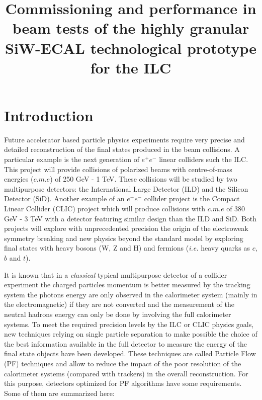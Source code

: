 \documentclass[a4paper,11pt]{article}
\title{\boldmath Commissioning and performance in beam tests of the highly granular SiW-ECAL technological prototype for the ILC}
\begin{document}
\maketitle
\flushbottom


\section{Introduction}

Future accelerator based particle physics experiments
require very precise and detailed reconstruction of the final states produced
in the beam collisions. A particular example is the next generation of $e^{+}e^{-}$
linear colliders such the ILC\cite{Behnke:2013xla,Baer:2013cma,Adolphsen:2013jya,Adolphsen:2013kya,Behnke:2013lya}.
This project will provide collisions of polarized beams with centre-of-mass energies ($c.m.e$) of 250 GeV - 1 TeV.
These collisions will be studied by two multipurpose detectors:
the International Large Detector (ILD) and the Silicon Detector (SiD)\cite{Behnke:2013lya}.
Another example of an $e^{+}e^{-}$ collider project is the Compact Linear Collider (CLIC)
project\cite{Aicheler:2012bya,Linssen:2012hp,Lebrun:2012hj}
which will produce collisions with $c.m.e$ of 380 GeV - 3 TeV
with a detector featuring similar design than the ILD and SiD.
Both projects will explore with unprecedented precision the origin of the electroweak symmetry breaking and new physics beyond the standard model by exploring final states with heavy bosons (W, Z  and H) and fermions ({\it i.e.} heavy quarks as $c$, $b$ and $t$).

It is known that in a {\it classical} typical multipurpose detector
of a collider experiment the charged particles momentum is better measured by the tracking system
the photons energy are only observed in the calorimeter system (mainly in the electromagnetic) if they are not converted
and the measurement of the neutral hadrons energy can only be done by involving the full calorimeter systems.
To meet the required precision levels by the ILC or CLIC physics goals,
new techniques relying on single particle separation to make possible the choice of the best information available
in the full detector to measure the energy of the final state objects have been developed.
These techniques are called Particle Flow (PF) techniques \cite{Brient:2002gh,Morgunov:2004ed,Sefkow:2015hna}
and allow to reduce the impact of the poor resolution of the calorimeter systems (compared with trackers) in the overall reconstruction.
For this purpose, detectors optimized for PF algorithms have some requirements. Some of them are summarized here:
\end{document}
